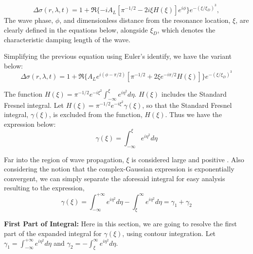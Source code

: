 \documentclass{article}
\begin{document}
\vspace{2pt}

\begin{equation}
\Delta \sigma(r,\lambda,t) = 1 + \Re\{-iA_{L}[\pi^{-1/2}-2i\xi H(\xi)]e^{i\phi}\}e^{-(\xi /\xi_{D})^{3}},
\end{equation}
The wave phase, $\phi$, and dimensionless distance from the resonance location, $\xi$, are clearly defined in the equations below, alongside $\xi_{D}$, which denotes the characteristic damping length of the wave. 

\vspace{2pt}
Simplifying the previous equation using Euler's identify, we have the variant below:
\begin{equation}
\Delta \sigma(r,\lambda,t) = 1 + \Re\{A_{L}e^{i(\phi-\pi/2)}[\pi^{-1/2}+2\xi e^{-i\pi/2}H(\xi)]\}e^{-(\xi/\xi_{D})^{3}}
\end{equation}

\vspace{2pt}

The function $H(\xi) = \pi^{-1/2}e^{-i\xi^{2}}\int_{-\infty}^{\xi}e^{i\eta^{2}}d\eta$. $H(\xi)$ includes the Standard Fresnel integral. Let $H(\xi) = \pi^{-1/2}e^{-i\xi^{2}}\gamma(\xi)$, so that the Standard Fresnel integral, $\gamma(\xi)$, is excluded from the function, $H(\xi)$. Thus we have the expression below:
\begin{equation}
    \gamma(\xi) = \int_{-\infty}^{\xi}e^{i\eta^{2}}d\eta
\end{equation}


Far into the region of wave propagation, $\xi$ is considered large and positive  \cite{Nicholson1990AnAR} \cite{1984prin.conf..513S}. Also considering the notion that the complex-Gaussian expression is exponentially convergent, we can simply separate the aforesaid integral for easy analysis resulting to the expression,
\begin{equation}
    \gamma(\xi) = \int_{-\infty}^{+ \infty}e^{i\eta^{2}}d\eta - \int_{\xi}^{\infty}e^{i\eta^{2}}d\eta = \gamma_{1} + \gamma_{2}
\end{equation}

\textbf{First Part of Integral:}
Here in this section, we are going to resolve the first part of the expanded integral for $\gamma(\xi)$, using contour integration. Let $\gamma_{1} = \int_{-\infty}^{+ \infty}e^{i\eta^{2}}d\eta$ and $\gamma_{2} = - \int_{\xi}^{\infty}e^{i\eta^{2}}d\eta$.
\end{document}
